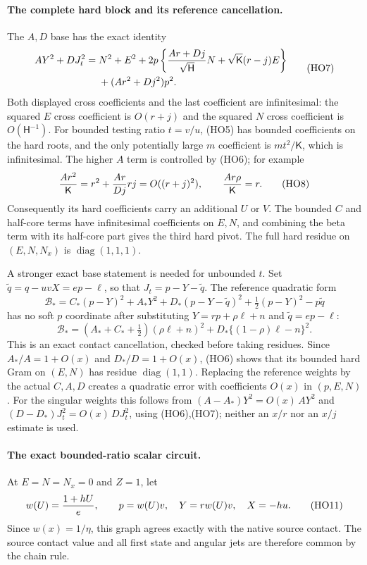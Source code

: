 \paragraph{The complete hard block and its reference cancellation.}
The $A,D$ base has the exact identity
\[
 \begin{split}
 AY^2+DJ_t^2={}&N^2+E^2
 +2p\left\{{Ar+Dj\over\sqrt{\mathsf H}}N
                 +\sqrt{\mathsf K}(r-j)E\right\}\\
 &+(Ar^2+Dj^2)p^2 .
 \end{split}
 \tag{HO7}
\]
Both displayed cross coefficients and the last coefficient are
infinitesimal: the squared $E$ cross coefficient is $O(r+j)$
and the squared $N$ cross coefficient is $O(\mathsf H^{-1})$.
For bounded testing ratio $t=v/u$, (HO5) has bounded coefficients
on the hard roots, and the only potentially large $m$ coefficient is
$mt^2/\mathsf K$, which is infinitesimal.
The higher $A$ term is controlled by (HO6); for example
\[
 {Ar^2\over\mathsf K}=r^2+{Ar\over Dj}rj=O((r+j)^2),
 \qquad {Ar\rho\over\mathsf K}=r .
 \tag{HO8}
\]
Consequently its hard coefficients carry an additional $U$ or $V$.
The bounded $C$ and half-core terms have infinitesimal coefficients
on $E,N$, and combining the beta term with its half-core part gives
the third hard pivot. The full hard residue on $(E,N,N_x)$ is
$\operatorname{diag}(1,1,1)$.

A stronger exact base statement is needed for unbounded $t$.
Set $\widetilde q=q-uvX=ep-\ell$, so that
$J_t=p-Y-\widetilde q$. The reference quadratic form
\[
 \mathcal B_*=
 C_*(p-Y)^2+A_*Y^2+D_*(p-Y-\widetilde q)^2
                    +\tfrac12(p-Y)^2-p\widetilde q
 \tag{HO9}
\]
has no soft $p$ coordinate after substituting
$Y=rp+\rho\ell+n$ and $\widetilde q=ep-\ell$:
\[
 \mathcal B_*=
 (A_*+C_*+\tfrac12)(\rho\ell+n)^2
                 +D_*\{(1-\rho)\ell-n\}^2 .
 \tag{HO10}
\]
This is an exact contact cancellation, checked before taking residues.
Since $A_*/A=1+O(x)$ and $D_*/D=1+O(x)$, (HO6) shows that
its bounded hard Gram on $(E,N)$ has residue $\operatorname{diag}(1,1)$.
Replacing the reference weights by the actual $C,A,D$ creates a
quadratic error with coefficients $O(x)$ in $(p,E,N)$.
For the singular weights this follows from
$(A-A_*)Y^2=O(x)\,AY^2$ and
$(D-D_*)J_t^2=O(x)\,DJ_t^2$, using (HO6),(HO7);
neither an $x/r$ nor an $x/j$ estimate is used.

\paragraph{The exact bounded-ratio scalar circuit.}
At $E=N=N_x=0$ and $Z=1$, let
\[
 w(U)={1+hU\over e},\qquad
 p=w(U)v,\quad Y=rw(U)v,\quad X=-hu .
 \tag{HO11}
\]
Since $w(x)=1/\eta$, this graph agrees exactly with the native
source contact. The source contact value and all first state and
angular jets are therefore common by the chain rule.

